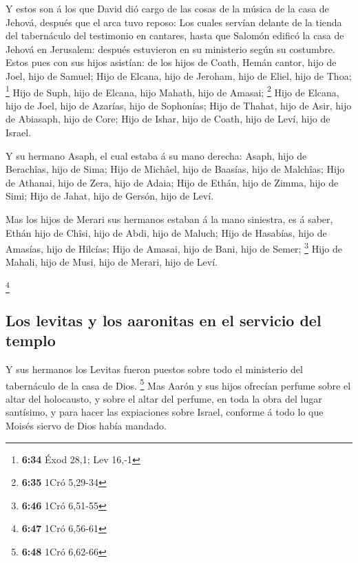  Y estos son á los que David dió cargo de las cosas de la
música de la casa de Jehová, después que el arca tuvo reposo:
 Los cuales servían delante de la tienda del tabernáculo
del testimonio en cantares, hasta que Salomón edificó la casa de Jehová
en Jerusalem: después estuvieron en su ministerio según su costumbre.
 Estos pues con sus hijos asistían: de los hijos de Coath,
Hemán cantor, hijo de Joel, hijo de Samuel;  Hijo de
Elcana, hijo de Jeroham, hijo de Eliel, hijo de Thoa; \footnote{\textbf{6:34}
  Éxod 28,1; Lev 16,-1}  Hijo de Suph, hijo de Elcana, hijo
Mahath, hijo de Amasai; \footnote{\textbf{6:35} 1Cró 5,29-34}
 Hijo de Elcana, hijo de Joel, hijo de Azarías, hijo de
Sophonías;  Hijo de Thahat, hijo de Asir, hijo de Abiasaph,
hijo de Core;  Hijo de Ishar, hijo de Coath, hijo de Leví,
hijo de Israel.

 Y su hermano Asaph, el cual estaba á su mano derecha:
Asaph, hijo de Berachîas, hijo de Sima;  Hijo de Michâel,
hijo de Baasías, hijo de Malchîas;  Hijo de Athanai, hijo
de Zera, hijo de Adaia;  Hijo de Ethán, hijo de Zimma, hijo
de Simi;  Hijo de Jahat, hijo de Gersón, hijo de Leví.

 Mas los hijos de Merari sus hermanos estaban á la mano
siniestra, es á saber, Ethán hijo de Chîsi, hijo de Abdi, hijo de
Maluch;  Hijo de Hasabías, hijo de Amasías, hijo de
Hilcías;  Hijo de Amasai, hijo de Bani, hijo de Semer;
\footnote{\textbf{6:46} 1Cró 6,51-55}  Hijo de Mahali, hijo
de Musi, hijo de Merari, hijo de Leví.

\footnote{\textbf{6:47} 1Cró 6,56-61}

\hypertarget{los-levitas-y-los-aaronitas-en-el-servicio-del-templo}{%
\subsection{Los levitas y los aaronitas en el servicio del
templo}\label{los-levitas-y-los-aaronitas-en-el-servicio-del-templo}}

 Y sus hermanos los Levitas fueron puestos sobre todo el
ministerio del tabernáculo de la casa de Dios. \footnote{\textbf{6:48}
  1Cró 6,62-66}  Mas Aarón y sus hijos ofrecían perfume
sobre el altar del holocausto, y sobre el altar del perfume, en toda la
obra del lugar santísimo, y para hacer las expiaciones sobre Israel,
conforme á todo lo que Moisés siervo de Dios había mandado.

